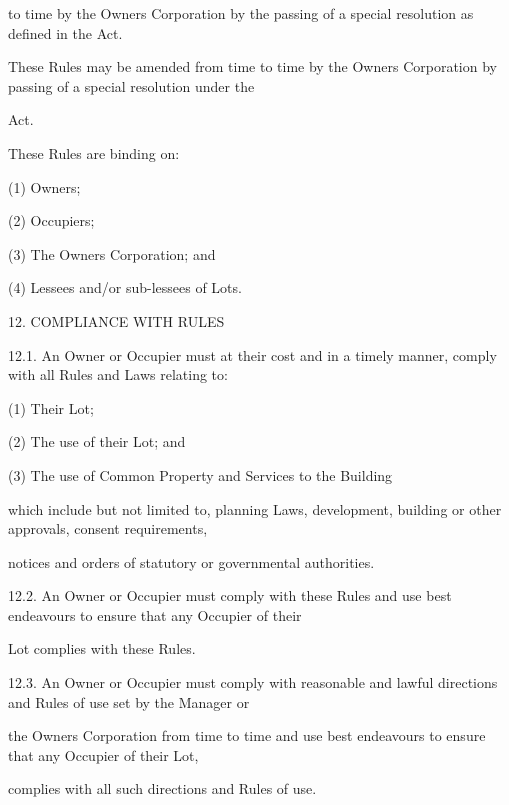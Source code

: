 \documentclass{article}
\begin{document}
{\fontsize{10.02}{1}to time by the Owners Corporation by the passing of a special resolution as defined in the Act. }

{\fontsize{10.02}{1}These Rules may be amended from time to time by the Owners Corporation by passing of a special resolution under the }

{\fontsize{10.02}{1}Act. }

{\fontsize{10.02}{1}These Rules are binding on: }

{\fontsize{9.962}{1}(1) Owners; }

{\fontsize{9.962}{1}(2) Occupiers; }

{\fontsize{9.962}{1}(3) The Owners Corporation; and }

{\fontsize{9.962}{1}(4) Lessees and/or sub-lessees of Lots. }



{\fontsize{9.99}{1}12. COMPLIANCE WITH RULES }

{\fontsize{9.99}{1}12.1. An Owner or Occupier must at their cost and in a timely manner, comply with all Rules and Laws relating to: }

{\fontsize{9.962}{1}(1) Their Lot; }

{\fontsize{9.962}{1}(2) The use of their Lot; and }

{\fontsize{9.962}{1}(3) The use of Common Property and Services to the Building }

{\fontsize{10.02}{1}which include but not limited to, planning Laws, development, building or other approvals, consent requirements, }

{\fontsize{10.02}{1}notices and orders of statutory or governmental authorities. }

{\fontsize{9.99}{1}12.2. An Owner or Occupier must comply with these Rules and use best endeavours to ensure that any Occupier of their }

{\fontsize{10.02}{1}Lot complies with these Rules. }

{\fontsize{9.99}{1}12.3. An Owner or Occupier must comply with reasonable and lawful directions and Rules of use set by the Manager or }

{\fontsize{10.02}{1}the Owners Corporation from time to time and use best endeavours to ensure that any Occupier of their Lot, }

{\fontsize{10.02}{1}complies with all such directions and Rules of use. }

\newpage
\end{document}
